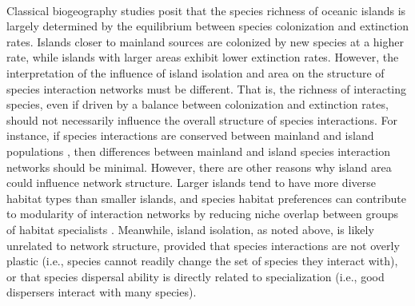 \paragraph*{}
Classical biogeography studies posit that the species richness of oceanic islands is largely determined by the equilibrium between species colonization and extinction rates. Islands closer to mainland sources are colonized by new species at a higher rate, while islands with larger areas exhibit lower extinction rates. However, the interpretation of the influence of island isolation and area on the structure of species interaction networks must be different. That is, the richness of interacting species, even if driven by a balance between colonization and extinction rates, should not necessarily influence the overall structure of species interactions. For instance, if species interactions are conserved between mainland and island populations \parencite{carstensen2018}, then differences between mainland and island species interaction networks should be minimal. However, there are other reasons why island area could influence network structure. Larger islands tend to have more diverse habitat types than smaller islands, and species habitat preferences can contribute to modularity of interaction networks by reducing niche overlap between groups of habitat specialists \parencite{santos2016}. Meanwhile, island isolation, as noted above, is likely unrelated to network structure, provided that species interactions are not overly plastic (i.e., species cannot readily change the set of species they interact with), or that species dispersal ability is directly related to specialization (i.e., good dispersers interact with many species).






